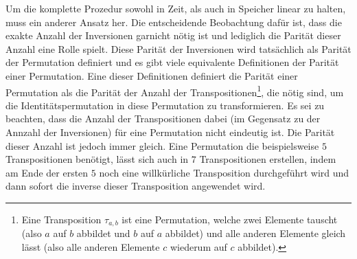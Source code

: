 \documentclass{whswinvcbook}
\begin{document}
Um die komplette Prozedur sowohl in Zeit, als auch in Speicher linear zu halten, muss ein anderer Ansatz her. Die entscheidende Beobachtung dafür ist, dass die exakte Anzahl der Inversionen garnicht nötig ist und lediglich die Parität dieser Anzahl eine Rolle spielt. Diese Parität der Inversionen wird tatsächlich als Parität der Permutation definiert und es gibt viele equivalente Definitionen der Parität einer Permutation. Eine dieser Definitionen definiert die Parität einer Permutation als die Parität der Anzahl der Transpositionen\footnote{Eine Transposition $\tau_{a,b}$ ist eine Permutation, welche zwei Elemente tauscht (also $a$ auf $b$ abbildet und $b$ auf $a$ abbildet) und alle anderen Elemente gleich lässt (also alle anderen Elemente $c$ wiederum auf $c$ abbildet).}, die nötig sind, um die Identitätspermutation in diese Permutation zu transformieren. Es sei zu beachten, dass die Anzahl der Transpositionen dabei (im Gegensatz zu der Annzahl der Inversionen) für eine Permutation nicht eindeutig ist. Die Parität dieser Anzahl ist jedoch immer gleich. Eine Permutation die beispielsweise $5$ Transpositionen benötigt, lässt sich auch in $7$ Transpositionen erstellen, indem am Ende der ersten $5$ noch eine willkürliche Transposition durchgeführt wird und dann sofort die inverse dieser Transposition angewendet wird.
\end{document}

